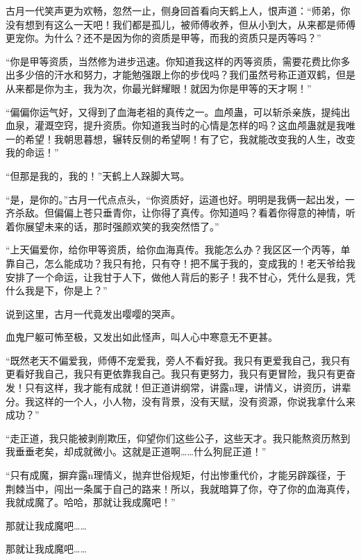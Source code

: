 
\begin{this_body}

古月一代笑声更为欢畅，忽然一止，侧身回首看向天鹤上人，恨声道：“师弟，你没有想到有这么一天吧！我们都是孤儿，被师傅收养，但从小到大，从来都是师傅更宠你。为什么？还不是因为你的资质是甲等，而我的资质只是丙等吗？”

“你是甲等资质，当然修为进步迅速。你知道我这样的丙等资质，需要花费比你多出多少倍的汗水和努力，才能勉强跟上你的步伐吗？我们虽然号称正道双鹤，但是从来都是你为主，我为次，你最光鲜耀眼！就因为你是甲等的天才啊！”

“偏偏你运气好，又得到了血海老祖的真传之一。血颅蛊，可以斩杀亲族，提纯出血泉，灌溉空窍，提升资质。你知道我当时的心情是怎样的吗？这血颅蛊就是我唯一的希望！我朝思暮想，辗转反侧的希望啊！有了它，我就能改变我的人生，改变我的命运！”

“但那是我的，我的！”天鹤上人跺脚大骂。

“是，是你的。”古月一代点点头，“你资质好，运道也好。明明是我俩一起出发，一齐杀敌。但偏偏上苍只垂青你，让你得了真传。你知道吗？看着你得意的神情，听着你展望未来的话，那时强颜欢笑的我突然悟了。”

“上天偏爱你，给你甲等资质，给你血海真传。我能怎么办？我区区一个丙等，单靠自己，怎么能成功？我只有抢，只有夺！把不属于我的，变成我的！老天爷给我安排了一个命运，让我甘于人下，做他人背后的影子！我不甘心，凭什么是我，凭什么我是下，你是上？”

说到这里，古月一代竟发出嘤嘤的哭声。

血鬼尸躯可怖至极，又发出如此怪声，叫人心中寒意无不更甚。

“既然老天不偏爱我，师傅不宠爱我，旁人不看好我。我只有更爱我自己，我只有更看好我自己，我只有更依靠我自己。我只有更努力，我只有更冒险，我只有更奋发！只有这样，我才能有成就！但正道讲纲常，讲露n理，讲情义，讲资历，讲辈分。我这样的一个人，小人物，没有背景，没有天赋，没有资源，你说我拿什么来成功？”

“走正道，我只能被剥削欺压，仰望你们这些公子，这些天才。我只能熬资历熬到我垂垂老矣，却成就微小。这就是正道啊……什么狗屁正道！”

“只有成魔，摒弃露n理情义，抛弃世俗规矩，付出惨重代价，才能另辟蹊径，于荆棘当中，闯出一条属于自己的路来！所以，我就暗算了你，夺了你的血海真传，我就成魔了。哈哈，那就让我成魔吧！”

那就让我成魔吧……

那就让我成魔吧……


\end{this_body}
